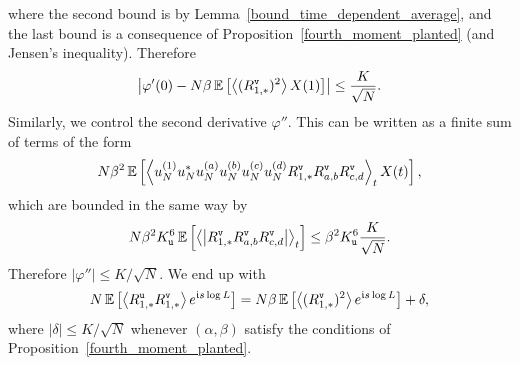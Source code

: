 \documentclass[final,12pt]{colt2018} %
\newcommand{\utt}{\textup{\texttt{u}}}
\newcommand{\vtt}{\textup{\texttt{v}}}
\begin{document}
where the second bound is by Lemma~\ref{bound_time_dependent_average}, and the last bound is a consequence of Proposition~\ref{fourth_moment_planted} (and Jensen's inequality). 
Therefore
\[\abs{\varphi'(0) - N\beta \E\left[\left\langle (R^{\vtt}_{1,*})^2\right\rangle X(1)\right]} \le \frac{K}{\sqrt{N}}.\]
Similarly, we control the second derivative $\varphi''$. This can be written as a finite  sum of terms of the form
\[N\beta^2 \E\left[\left\langle u_N^{(1)}u_N^{*}u_N^{(a)}u_N^{(b)}u_N^{(c)}u_N^{(d)} R^{\vtt}_{1,*}R^{\vtt}_{a,b}R^{\vtt}_{c,d}\right\rangle_t X(t)\right],\]
which are bounded in the same way by 
\[N\beta^2 K_{\utt}^6 \E\left[\left\langle \abs{ R^{\vtt}_{1,*}R^{\vtt}_{a,b}R^{\vtt}_{c,d}}\right\rangle_t \right] \le \beta^2 K_{\utt}^6 \frac{K}{\sqrt{N}}.\]
Therefore $|\varphi''| \le K/\sqrt{N}$. 
We end up with 
\begin{equation}\label{important_1}
N\E\left[\left\langle R^{\utt}_{1,*} R^{\vtt}_{1,*}\right\rangle e^{\imnb s \log L}\right] = N\beta \E\left[\left\langle (R^{\vtt}_{1,*})^2\right\rangle e^{\imnb s \log L}\right] + \delta,
\end{equation}
where $|\delta| \le K/\sqrt{N}$ whenever $(\alpha,\beta)$ satisfy the conditions of  Proposition~\ref{fourth_moment_planted}. 
\end{document}
